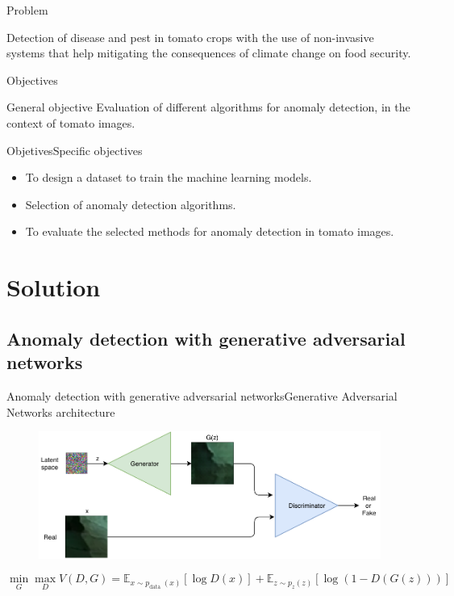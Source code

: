 \documentclass[15pt]{beamer} %
\begin{document}
\begin{frame}{Problem}
  
Detection of disease and pest in tomato crops with the use of non-invasive systems that help mitigating the consequences of climate change on food security.
\end{frame}

\begin{frame}{Objectives}
 \begin{block}{General objective}
 Evaluation of different algorithms for anomaly
detection, in the context of tomato images.
 \end{block}
\end{frame}


\begin{frame}{Objetives}{\tiny{Specific objectives}}
  
  \begin{itemize}
  \item To design a dataset to train the machine learning models.
  \item Selection of anomaly detection algorithms.
  \item To evaluate the selected methods for anomaly detection in tomato images.
  \end{itemize}
\end{frame}


\section{Solution}

\subsection{Anomaly detection with generative adversarial networks}


\begin{frame}{Anomaly detection with generative adversarial networks}{\tiny{Generative Adversarial Networks architecture}}
  \begin{figure}
   \centering 
   \includegraphics[width=\textwidth]{gan}
  \end{figure}
  
  \begin{equation}
  \nonumber
 \min _{G} \max _{D} V(D, G)=\mathbb{E}_{x \sim p_{\text {data }}(x)}[\log D(x)]+\mathbb{E}_{z \sim p_{z}(z)}[\log (1-D(G(z)))]
\end{equation}
\end{frame}
\end{document}
